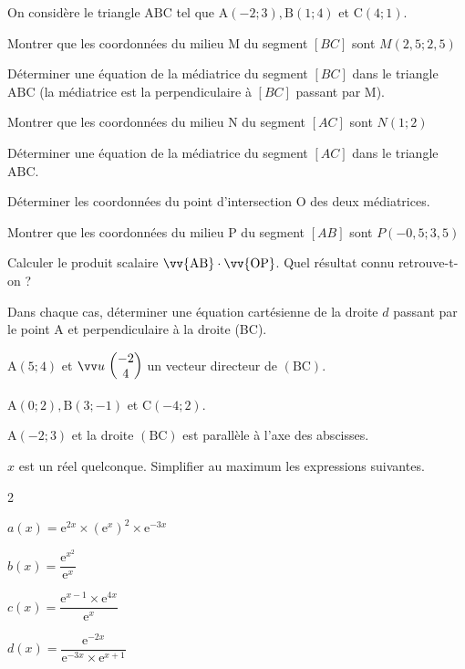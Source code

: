 \documentclass[12pt,a4paper]{article}  %
\begin{document}
On considère le triangle $\mathrm{ABC}$ tel que $\mathrm{A}(-2 ;3), \mathrm{B}(1 ; 4)$ et $\mathrm{C}(4 ; 1)$.
\begin{enumMet}
    \item Montrer que les coordonnées du milieu M du segment $[BC]$ sont $M(2,5;2,5)$
    \item Déterminer une équation de la médiatrice  du segment $[BC]$ dans le triangle $\mathrm{ABC}$ (la médiatrice est la perpendiculaire à $[BC]$ passant par M).
    \item {} Montrer que les coordonnées du milieu N du segment $[AC]$ sont $N(1;2)$
    \item Déterminer une équation de la médiatrice  du segment $[AC]$ dans le triangle $\mathrm{ABC}$.
    \item Déterminer les coordonnées du point d'intersection $\mathrm{O}$ des deux médiatrices.
    \item {} Montrer que les coordonnées du milieu P du segment $[AB]$ sont $P(-0,5;3,5)$
    \item Calculer le produit scalaire $\vv{\mathrm{AB}} \cdot \vv{\mathrm{OP}}$. Quel résultat connu retrouve-t-on ?
\end{enumMet}


Dans chaque cas, déterminer une équation cartésienne de la droite $d$ passant par le point $\mathrm{A}$ et perpendiculaire à la droite (BC).
\begin{enumMet}
    \item {} $\mathrm{A}(5 ; 4)$ et $\Coord{u}{-2}{4}$ un vecteur directeur de $(\mathrm{BC})$.
    \item $\mathrm{A}(0 ; 2), \mathrm{B}(3 ;-1)$ et $\mathrm{C}(-4 ; 2)$.
    \item $\mathrm{A}(-2 ; 3)$ et la droite $(\mathrm{BC})$ est parallèle à l'axe des abscisses.
\end{enumMet}

$x$ est un réel quelconque. Simplifier au maximum les expressions suivantes.
\begin{multicols}{2}
	\begin{enumMet}
	\item $a(x)=\mathrm{e}^{2 x} \times\left(\mathrm{e}^x\right)^2 \times \mathrm{e}^{-3 x}$
	\item $b(x)=\dfrac{\mathrm{e}^{x^2}}{\mathrm{e}^x}$
	\item $c(x)=\dfrac{\mathrm{e}^{x-1} \times \mathrm{e}^{4 x}}{\mathrm{e}^x}$
	\item {} $d(x)=\dfrac{\mathrm{e}^{-2 x}}{\mathrm{e}^{-3 x} \times \mathrm{e}^{x+1}}$
\end{enumMet}
\end{multicols}
\end{document}
